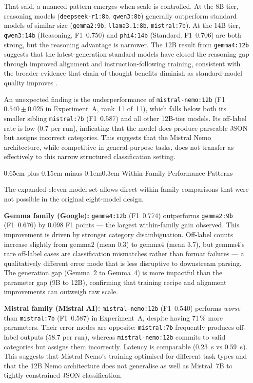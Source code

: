 \documentclass[10pt,a4paper,twocolumn]{article}
\makeatletter
\renewcommand\subsection{\@startsection{subsection}{2}{0pt}%
  {0.65em plus 0.15em minus 0.1em}{0.3em}%
  {\normalfont\normalsize\itshape}}
\makeatother
\begin{document}
That said, a nuanced pattern emerges when scale is controlled.
At the 8B tier, reasoning models (\texttt{deepseek-r1:8b},
\texttt{qwen3:8b}) generally outperform standard models of similar
size (\texttt{gemma2:9b}, \texttt{llama3.1:8b}, \texttt{mistral:7b}).
At the 14B tier, \texttt{qwen3:14b} (Reasoning, F1~0.750) and
\texttt{phi4:14b} (Standard, F1~0.706) are both strong, but the
reasoning advantage is narrower. The 12B result from \texttt{gemma4:12b}
suggests that the latest-generation standard models have closed the
reasoning gap through improved alignment and instruction-following
training, consistent with the broader evidence that chain-of-thought
benefits diminish as standard-model quality improves
\cite{wei2022chainofthought,guo2025deepseekr1}.

An unexpected finding is the underperformance of \texttt{mistral-nemo:12b}
(F1~$0.540 \pm 0.025$ in Experiment~A, rank~11 of~11), which falls
below both its smaller sibling \texttt{mistral:7b} (F1~$0.587$) and
all other 12B-tier models. Its off-label rate is low (0.7 per run),
indicating that the model does produce parseable JSON but assigns
incorrect categories. This suggests that the Mistral Nemo architecture,
while competitive in general-purpose tasks, does not transfer as
effectively to this narrow structured classification setting.

\subsection{Within-Family Performance Patterns}

The expanded eleven-model set allows direct within-family comparisons
that were not possible in the original eight-model design.

\textbf{Gemma family (Google):} \texttt{gemma4:12b} (F1~0.774)
outperforms \texttt{gemma2:9b} (F1~0.676) by 0.098 F1 points ---
the largest within-family gain observed. This improvement is driven by
stronger category disambiguation.
Off-label counts increase slightly from gemma2 (mean 0.3) to
gemma4 (mean 3.7), but gemma4's rare off-label cases are
classification mismatches rather than format failures ---
a qualitatively different error mode that is less disruptive
to downstream parsing. The generation gap (Gemma~2 to
Gemma~4) is more impactful than the parameter gap (9B to 12B),
confirming that training recipe and alignment improvements can
outweigh raw scale.

\textbf{Mistral family (Mistral AI):} \texttt{mistral-nemo:12b}
(F1~0.540) performs \emph{worse} than \texttt{mistral:7b} (F1~0.587)
in Experiment~A, despite having 71\,\% more parameters. Their
error modes are opposite: \texttt{mistral:7b} frequently produces
off-label outputs (58.7 per run), whereas \texttt{mistral-nemo:12b}
commits to valid categories but assigns them incorrectly.
Latency is comparable (0.23~s vs 0.59~s). This suggests that Mistral
Nemo's training optimised for different task types and that the
12B Nemo architecture does not generalise as well as Mistral~7B to
tightly constrained JSON classification.
\end{document}
